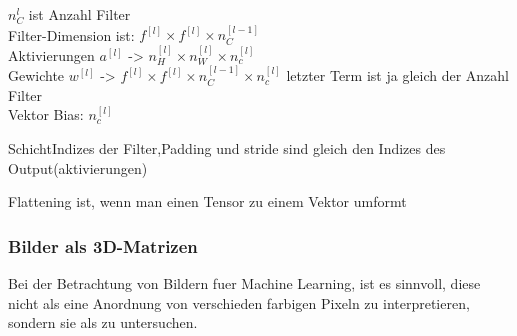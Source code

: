 \documentclass[../main]{subfiles}
\begin{document}
$n_C^{l}$ ist Anzahl Filter\\

Filter-Dimension ist: $f^{[l]} \times f^{[l]} \times n_C^{[l-1]}$\\
Aktivierungen $a^{[l]}$ -> $n_H^{[l]} \times n_W^{[l]} \times n_c^{[l]}$\\
Gewichte $w^{[l]}$ -> $f^{[l]} \times f^{[l]} \times n_C^{[l-1]} \times
n_c^{[l]}$ letzter Term ist ja gleich der Anzahl Filter\\
Vektor Bias: $n_c^{[l]}$

SchichtIndizes der Filter,Padding und stride sind gleich den Indizes des Output(aktivierungen)


Flattening ist, wenn man einen Tensor zu einem Vektor umformt

\subsubsection{Bilder als 3D-Matrizen}
Bei der Betrachtung von Bildern fuer Machine Learning, ist es sinnvoll, diese
nicht als eine Anordnung von verschieden farbigen Pixeln zu interpretieren,
sondern sie als  zu untersuchen.
\end{document}

